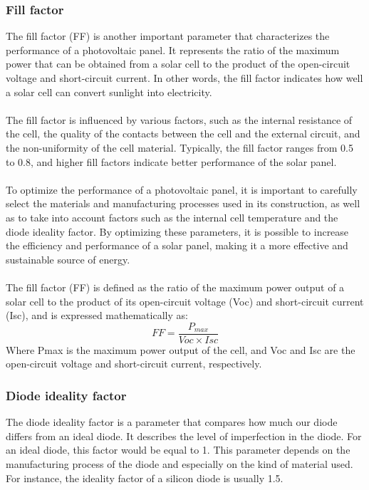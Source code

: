 \documentclass{report}
\begin{document}
\subsubsection{Fill factor}
The fill factor (FF) is another important parameter that characterizes the performance of a photovoltaic panel. It represents the ratio of the maximum power that can be obtained from a solar cell to the product of the open-circuit voltage and short-circuit current. In other words, the fill factor indicates how well a solar cell can convert sunlight into electricity.\\
\\
The fill factor is influenced by various factors, such as the internal resistance of the cell, the quality of the contacts between the cell and the external circuit, and the non-uniformity of the cell material. Typically, the fill factor ranges from 0.5 to 0.8, and higher fill factors indicate better performance of the solar panel.\\
\\
To optimize the performance of a photovoltaic panel, it is important to carefully select the materials and manufacturing processes used in its construction, as well as to take into account factors such as the internal cell temperature and the diode ideality factor. By optimizing these parameters, it is possible to increase the efficiency and performance of a solar panel, making it a more effective and sustainable source of energy.\\
\\
The fill factor (FF) is defined as the ratio of the maximum power output of a solar cell to the product of its open-circuit voltage (Voc) and short-circuit current (Isc), and is expressed mathematically as:
\begin{equation}
FF  = \frac{P_{max}}{Voc \times Isc} 
\end{equation}
Where Pmax is the maximum power output of the cell, and Voc and Isc are the open-circuit voltage and short-circuit current, respectively. 
\subsubsection{Diode ideality factor}
The diode ideality factor is a parameter that compares how much our diode differs from an ideal diode. It describes the level of imperfection in the diode. For an ideal diode, this factor would be equal to 1. This parameter depends on the manufacturing process of the diode and especially on the kind of material used. For instance, the ideality factor of a silicon diode is usually 1.5.
\end{document}
